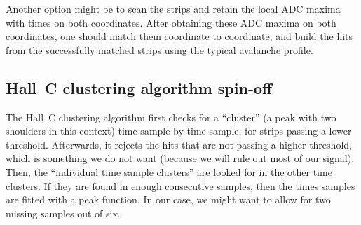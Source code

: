 Another option might be to scan the strips and retain the local ADC maxima with times on both coordinates. After obtaining these ADC maxima on both coordinates, one should match them coordinate to coordinate, and build the hits from the successfully matched strips using the typical avalanche profile.

\subsection{Hall~C clustering algorithm spin-off}

The Hall~C clustering algorithm first checks for a ``cluster'' (a peak with two shoulders in this context) time sample by time sample, for strips passing a lower threshold.
Afterwards, it rejects the hits that are not passing a higher threshold, which is something we do not want (because we will rule out most of our signal).
Then, the ``individual time sample clusters'' are looked for in the other time clusters. If they are found in enough consecutive samples, then the times samples are fitted with a peak function.
In our case, we might want to allow for two missing samples out of six.

%
%
%
%

%
%
%
